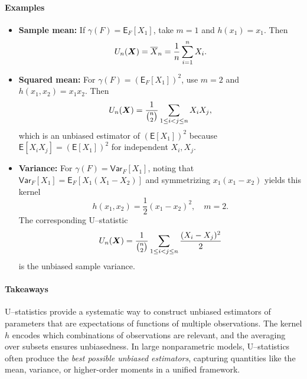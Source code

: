 \paragraph{Examples}%
\begin{itemize}
    \item \textbf{Sample mean:} If \(\gamma(F) = \mathsf{E}_F[X_1]\), take \(m=1\) and \(h(x_1)=x_1\). Then 
    \[
        U_n(\boldsymbol{X}) = \overline{X}_n = \frac{1}{n}\sum_{i=1}^n X_i.
    \]
    
    \item \textbf{Squared mean:} For \(\gamma(F) = (\mathsf{E}_F[X_1])^2\), use \(m=2\) and \(h(x_1,x_2) = x_1 x_2\). Then
    \[
        U_n(\boldsymbol{X}) = \frac{1}{\binom{n}{2}} \sum_{1\le i<j\le n} X_i X_j,
    \]
    which is an unbiased estimator of \((\mathsf{E}[X_1])^2\) because \(\mathsf{E}[X_i X_j] = (\mathsf{E}[X_1])^2\) for independent \(X_i, X_j\).
    
    \item \textbf{Variance:} For \(\gamma(F) = \mathsf{Var}_F[X_1]\), noting that \(\mathsf{Var}_{F}\left[X_1\right]  = \mathsf{E}_{F}\left[X_1(X_1-X_2)\right] \) and symmetrizing \(x_1(x_1-x_2)\) yields this kernel
    \[
        h(x_1,x_2) = \frac{1}{2}(x_1-x_2)^2, \quad m=2.
    \]
    The corresponding U--statistic
    \[
        U_n(\boldsymbol{X}) = \frac{1}{\binom{n}{2}} \sum_{1\le i<j \le n} \frac{(X_i-X_j)^2}{2}
    \]
    is the unbiased sample variance.
\end{itemize}

\paragraph{Takeaways}%
U--statistics provide a systematic way to construct unbiased estimators of parameters that are expectations of functions of multiple observations. The kernel \(h\) encodes which combinations of observations are relevant, and the averaging over subsets ensures unbiasedness. In large nonparametric models, U--statistics often produce the \emph{best possible unbiased estimators}, capturing quantities like the mean, variance, or higher-order moments in a unified framework.
